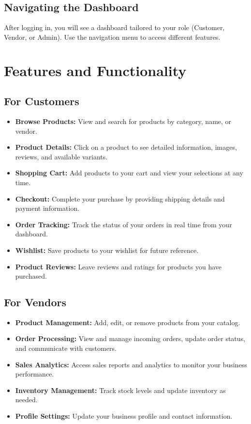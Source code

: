\subsection{Navigating the Dashboard}
After logging in, you will see a dashboard tailored to your role (Customer, Vendor, or Admin). Use the navigation menu to access different features.

\section{Features and Functionality}
\subsection{For Customers}
\begin{itemize}
    \item \textbf{Browse Products:} View and search for products by category, name, or vendor.
    \item \textbf{Product Details:} Click on a product to see detailed information, images, reviews, and available variants.
    \item \textbf{Shopping Cart:} Add products to your cart and view your selections at any time.
    \item \textbf{Checkout:} Complete your purchase by providing shipping details and payment information.
    \item \textbf{Order Tracking:} Track the status of your orders in real time from your dashboard.
    \item \textbf{Wishlist:} Save products to your wishlist for future reference.
    \item \textbf{Product Reviews:} Leave reviews and ratings for products you have purchased.
\end{itemize}

\subsection{For Vendors}
\begin{itemize}
    \item \textbf{Product Management:} Add, edit, or remove products from your catalog.
    \item \textbf{Order Processing:} View and manage incoming orders, update order status, and communicate with customers.
    \item \textbf{Sales Analytics:} Access sales reports and analytics to monitor your business performance.
    \item \textbf{Inventory Management:} Track stock levels and update inventory as needed.
    \item \textbf{Profile Settings:} Update your business profile and contact information.
\end{itemize}


